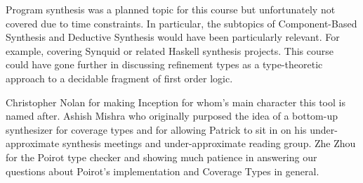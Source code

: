 \documentclass[review, sigplan]{acmart}
\begin{document}
Program synthesis was a planned topic for this course but unfortunately not
covered due to time constraints. In particular, the subtopics of Component-Based
Synthesis and Deductive Synthesis would have been particularly relevant. For
example, covering Synquid or related Haskell synthesis projects. This course
could have gone further in discussing refinement types as a type-theoretic
approach to a decidable fragment of first order logic.

\begin{acks}
    Christopher Nolan for making Inception for whom's main character this tool is
    named after.
    Ashish Mishra who originally purposed the idea of a bottom-up synthesizer
    for coverage types and for allowing Patrick to sit in on his
    under-approximate synthesis meetings and under-approximate reading group.
    Zhe Zhou for the Poirot type checker and showing much patience in answering
    our questions about Poirot's implementation and Coverage Types in general.
\end{acks}



\end{document}
